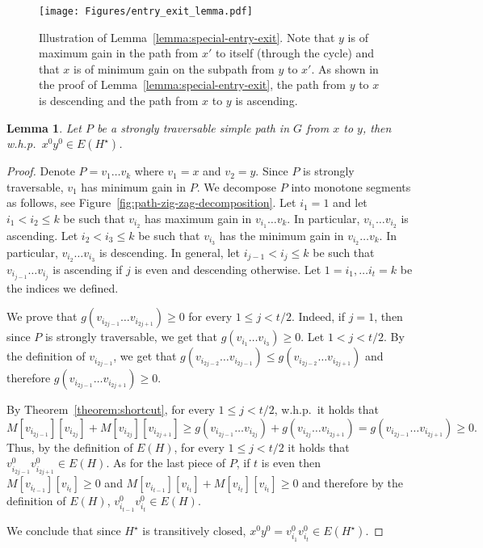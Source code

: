 \documentclass[11pt]{article}
\newtheorem{lemma}[theorem]{Lemma}
\begin{document}
\begin{figure}
    \centering
\texttt{[image: Figures/entry\_exit\_lemma.pdf]}
\caption{Illustration of Lemma~\ref{lemma:special-entry-exit}. Note that $y$ is of maximum gain in the path from $x'$ to itself (through the cycle) and that $x$ is of minimum gain on the subpath from $y$ to $x'$. 
As shown in the proof of Lemma~\ref{lemma:special-entry-exit}, the path from $y$ to $x$ is descending and 
the path from $x$ to $y$ is ascending.}
\label{fig:entry-exit-cycle}
\end{figure}


\begin{lemma}\label{lemma:0-0-strong}
    Let $P$ be a strongly traversable simple path in $G$ from $x$ to $y$, then w.h.p.\ $x^0 y^0 \in E(H^\star)$.
\end{lemma}

\begin{proof}
    Denote $P= v_1\ldots v_k$ where $v_1=x$ and $v_2 = y$. Since $P$ is strongly traversable, $v_1$ has minimum gain in $P$. We decompose $P$ into monotone segments as follows, see Figure~\ref{fig:path-zig-zag-decomposition}. Let $i_1=1$ and let $i_1 < i_2 \le k$ be such that $v_{i_2}$ has maximum gain in $v_{i_1}\ldots v_k$. In particular, $v_{i_1} \ldots v_{i_2}$ is ascending.
    Let $i_2 < i_3 \le k$ be such that $v_{i_3}$ has the minimum gain in 
    $v_{i_2} \ldots v_k$. In particular, 
    $v_{i_2} \ldots v_{i_3}$ is descending. 
    In general, let $  i_{j-1} < i_j \le k$ be such that  $v_{i_{j-1}} \ldots v_{i_j}$ is ascending if $j$ is even and descending otherwise. Let $1=i_1,\ldots i_t=k$ be the indices we defined.
    
    We prove that 
    $g(v_{i_{2j-1}}\ldots v_{i_{2j+1}}) \ge 0$ for every $1\le j < t/2$. Indeed, if $j=1$, then since $P$ is strongly traversable, we get that $g(v_{i_{1}}\ldots v_{i_{3}}) \ge 0$. Let $1< j < t/2$. By the definition of $v_{i_{2j-1}}$, we get that $g(v_{i_{2j-2}}\ldots v_{i_{2j-1}}) \le g(v_{i_{2j-2}}\ldots v_{i_{2j+1}}) $ and therefore $g(v_{i_{2j-1}}\ldots v_{i_{2j+1}}) \ge 0$.
    
    By Theorem~\ref{theorem:shortcut}, for every $1\le j < t/2$, w.h.p.\ it holds that 
    $$M[v_{i_{2j-1}}][v_{i_{2j}}] + M[v_{i_{2j}}][v_{i_{2j+1}}] \ge
    g(v_{i_{2j-1}}\ldots v_{i_{2j}}) + g(v_{i_{2j}}\ldots v_{i_{2j+1}})
    =
    g(v_{i_{2j-1}}\ldots v_{i_{2j+1}}) \ge 0.$$
    Thus, by the definition of $E(H)$, for every $1\le j<t/2$ it holds that $v_{i_{2j-1}}^0 v_{i_{2j+1}}^0 \in  E(H)$. As for the last piece of $P$, if $t$ is even then $M[v_{i_{t-1}}][v_{i_t}] \ge 0$
    and $M[v_{i_{t-1}}][v_{i_t}] + M[v_{i_{t}}][v_{i_t}] \ge 0$ and therefore by the definition of $E(H)$, $v_{i_{t-1}}^0 v_{i_t}^0 \in E(H)$. 
    
    We conclude that since $H^\star$ is transitively closed, $x^0 y^0 = v^0_{i_1} v^0_{i_t} \in E(H^\star)$.
\end{proof}
\end{document}
